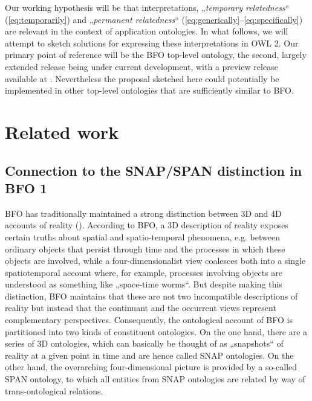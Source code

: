 \documentclass{ao2e}
\begin{document}
Our working hypothesis will be that interpretations, „\emph{temporary
relatedness}“ (\ref{eq:temporarily}) and „\emph{permanent relatedness}“
(\ref{eq:generically}--\ref{eq:specifically}) are relevant in the context of
application ontologies. %
 In what follows,
we will attempt to sketch solutions for expressing these interpretations in OWL
2. Our primary point of reference will be the BFO top-level ontology, the
second, largely extended release being under current development, with a
preview release available at \cite{BFO2:Graz}.  Nevertheless
the proposal sketched here could potentially be implemented in other top-level
ontologies that are sufficiently similar to BFO.

\section{Related work}
\subsection{Connection to the SNAP/SPAN distinction in BFO 1}


BFO has traditionally maintained a strong distinction between 3D and 4D accounts
of reality (\cite{BFO1:ref}). According to BFO, a 3D description of reality exposes certain
truths about spatial and spatio-temporal phenomena, e.g. between ordinary
objects that persist through time and the processes in which these objects are
involved, while a four-dimensionalist view coalesces both into a single
spatiotemporal account where, for example, processes involving objects are
understood as something like „space-time worms“.  But despite making this
distinction, BFO maintains that these are not two incompatible descriptions of
reality but instead that the continuant and the occurrent views represent
complementary perspectives. Consequently, the ontological account of BFO is
partitioned into two kinds of constituent ontologies. On the one hand, there are
a series of 3D ontologies, which can basically be thought of as „snapshots“ of
reality at a given point in time and are hence called SNAP ontologies. On the
other hand, the overarching four-dimensional picture is provided by a so-called
SPAN ontology, to which all entities from SNAP ontologies are related by way of
trans-ontological relations.
\end{document}
